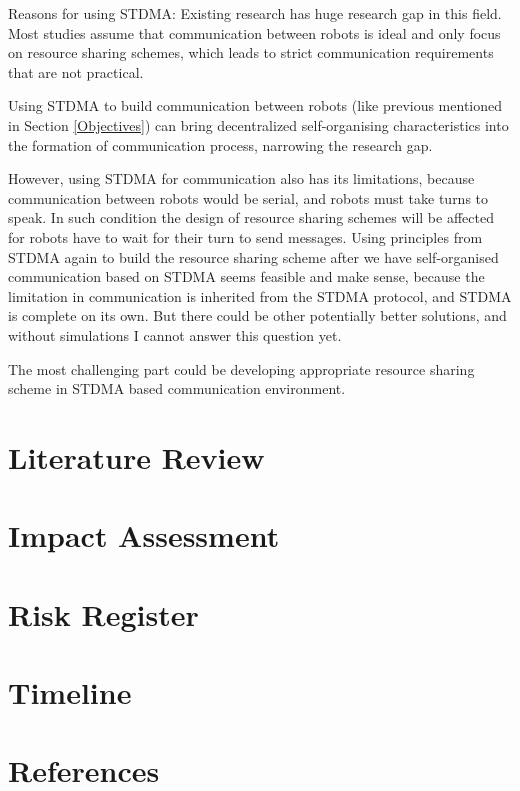 \documentclass[12pt, oneside]{article}
\begin{document}
Reasons for using STDMA: Existing research has huge research gap in this field. Most studies assume that communication between robots is ideal \cite{Current_Research_Gap} and only focus on resource sharing schemes, which leads to strict communication requirements that are not practical.

Using STDMA to build communication between robots (like previous mentioned in Section \ref{Objectives}) can bring decentralized self-organising characteristics into the formation of communication process, narrowing the research gap. 

However, using STDMA for communication also has its limitations, because communication between robots would be serial, and robots must take turns to speak. In such condition the design of resource sharing schemes will be affected for robots have to wait for their turn to send messages. Using principles from STDMA again  to build the resource sharing scheme after we have self-organised communication based on STDMA seems feasible and make sense, because the limitation in communication is inherited from the STDMA protocol, and STDMA is complete on its own. But there could be other potentially better solutions, and without simulations I cannot answer this question yet. 

The most challenging part could be developing appropriate resource sharing scheme in STDMA based communication environment.

\pagebreak

\section{Literature Review}
\label{Literature_Review}
\section{Impact Assessment}
\section{Risk Register}
\section{Timeline}


\section{References}




\end{document}
